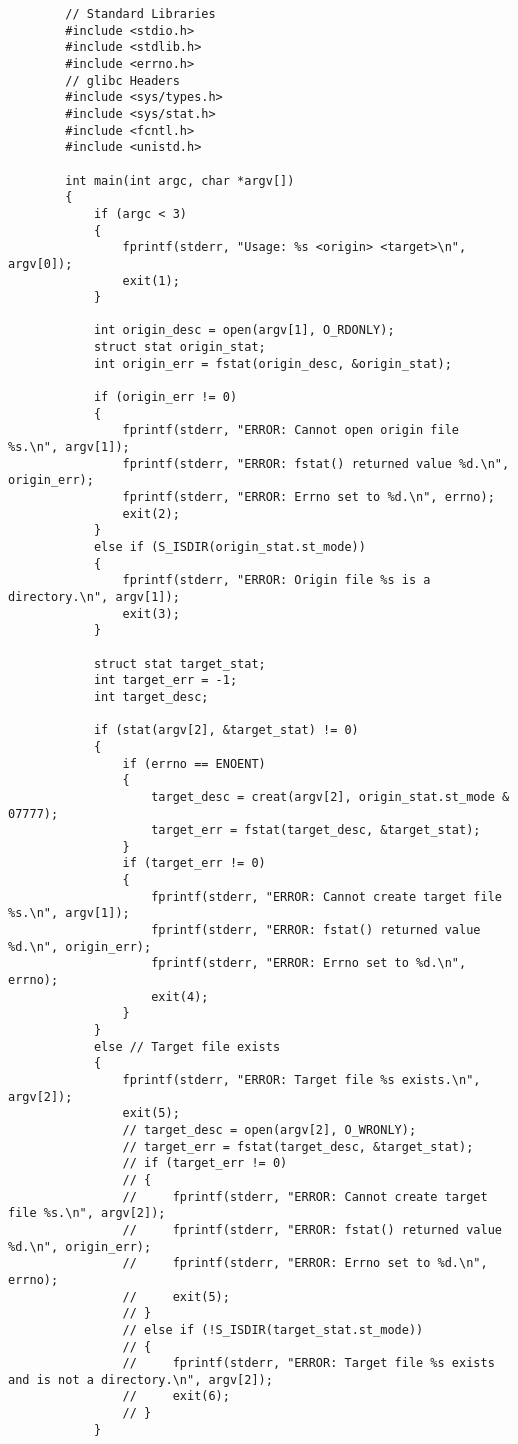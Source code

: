 \documentclass{ctexart}
\begin{document}
    \begin{verbatim}
        // Standard Libraries
        #include <stdio.h>
        #include <stdlib.h>
        #include <errno.h>
        // glibc Headers
        #include <sys/types.h>
        #include <sys/stat.h>
        #include <fcntl.h>
        #include <unistd.h>
        
        int main(int argc, char *argv[])
        {
            if (argc < 3)
            {
                fprintf(stderr, "Usage: %s <origin> <target>\n", argv[0]);
                exit(1);
            }
        
            int origin_desc = open(argv[1], O_RDONLY);
            struct stat origin_stat;
            int origin_err = fstat(origin_desc, &origin_stat);
        
            if (origin_err != 0)
            {
                fprintf(stderr, "ERROR: Cannot open origin file %s.\n", argv[1]);
                fprintf(stderr, "ERROR: fstat() returned value %d.\n", origin_err);
                fprintf(stderr, "ERROR: Errno set to %d.\n", errno);
                exit(2);
            }
            else if (S_ISDIR(origin_stat.st_mode))
            {
                fprintf(stderr, "ERROR: Origin file %s is a directory.\n", argv[1]);
                exit(3);
            }
        
            struct stat target_stat;
            int target_err = -1;
            int target_desc;
        
            if (stat(argv[2], &target_stat) != 0)
            {
                if (errno == ENOENT)
                {
                    target_desc = creat(argv[2], origin_stat.st_mode & 07777);
                    target_err = fstat(target_desc, &target_stat);
                }
                if (target_err != 0)
                {
                    fprintf(stderr, "ERROR: Cannot create target file %s.\n", argv[1]);
                    fprintf(stderr, "ERROR: fstat() returned value %d.\n", origin_err);
                    fprintf(stderr, "ERROR: Errno set to %d.\n", errno);
                    exit(4);
                }
            }
            else // Target file exists
            {
                fprintf(stderr, "ERROR: Target file %s exists.\n", argv[2]);
                exit(5);
                // target_desc = open(argv[2], O_WRONLY);
                // target_err = fstat(target_desc, &target_stat);
                // if (target_err != 0)
                // {
                //     fprintf(stderr, "ERROR: Cannot create target file %s.\n", argv[2]);
                //     fprintf(stderr, "ERROR: fstat() returned value %d.\n", origin_err);
                //     fprintf(stderr, "ERROR: Errno set to %d.\n", errno);
                //     exit(5);
                // }
                // else if (!S_ISDIR(target_stat.st_mode))
                // {
                //     fprintf(stderr, "ERROR: Target file %s exists and is not a directory.\n", argv[2]);
                //     exit(6);
                // }
            }
        

\end{verbatim}
\end{document}
